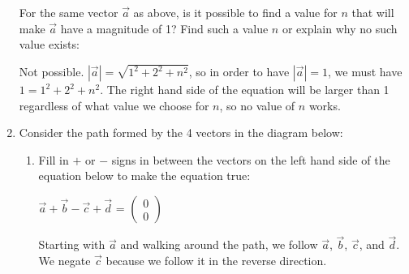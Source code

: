 \documentclass[12pt, twoside]{article}
\begin{document}
\begin{enumerate}
    For the same vector $\vec{a}$ as above, is it possible to find a value for $n$ that will make $\vec{a}$ have a magnitude of 1? Find such a value $n$ or explain why no such value exists:
    
    \vspace{.3cm}

    Not possible. $|\vec{a}| = \sqrt{1^2 + 2^2 + n^2}$, so in order to have $|\vec{a}| = 1$, we must have $1 = 1^2 + 2^2 + n^2$. The right hand side of the equation will be larger than 1 regardless of what value we choose for $n$, so no value of $n$ works.
    \newpage

    \item Consider the path formed by the 4 vectors in the diagram below:
    \begin{center}
    \end{center}
    
    \begin{enumerate}
        \item Fill in $+$ or $-$ signs in between the vectors on the left hand side of the equation below to make the equation true:

        \vspace{1cm}
    
        \begin{center}
            $\vec{a} + \vec{b} - \vec{c} + \vec{d}$ \hspace{.2cm} = \hspace{.2cm} $\begin{pmatrix} 0\\ 0\end{pmatrix}$
        \end{center}

        Starting with $\vec{a}$ and walking around the path, we follow $\vec{a}$, $\vec{b}$, $\vec{c}$, and $\vec{d}$. We negate $\vec{c}$ because we follow it in the reverse direction.

        \vspace{1cm}


\end{enumerate}
\end{enumerate}
\end{document}
